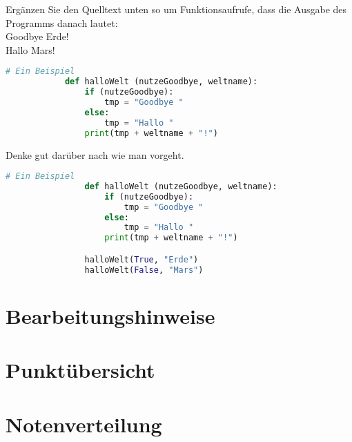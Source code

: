 \documentclass[a4paper]{scrartcl}
\begin{document}
    \begin{aufgabe}
        Ergänzen Sie den Quelltext unten so um Funktionsaufrufe, dass die Ausgabe des Programms danach lautet:\\
        Goodbye Erde!\\
        Hallo Mars!
        \begin{lstlisting}[language=python,gobble=10]
            # Ein Beispiel
            def halloWelt (nutzeGoodbye, weltname):
                if (nutzeGoodbye):
                    tmp = "Goodbye "
                else:
                    tmp = "Hallo "
                print(tmp + weltname + "!")
        \end{lstlisting}
        \begin{erwartungen}
        \end{erwartungen}
        \begin{bearbeitungshinweis}
            Denke gut darüber nach wie man vorgeht.
        \end{bearbeitungshinweis}
        \begin{loesung}
            \begin{lstlisting}[language=python,gobble=14]
                # Ein Beispiel
                def halloWelt (nutzeGoodbye, weltname):
                    if (nutzeGoodbye):
                        tmp = "Goodbye "
                    else:
                        tmp = "Hallo "
                    print(tmp + weltname + "!")

                halloWelt(True, "Erde")
                halloWelt(False, "Mars")
            \end{lstlisting}
        \end{loesung}
    \end{aufgabe}

\section*{Bearbeitungshinweise}
    \bearbeitungshinweisliste

\section*{Punktübersicht}
    \punktuebersicht

\section*{Notenverteilung}
    \notenverteilung
\end{document}

